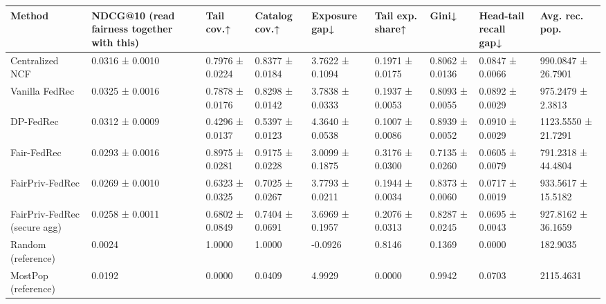 \begin{tabular}{lllllllll}
\toprule
Method & NDCG@10 (read fairness together with this) & Tail cov.↑ & Catalog cov.↑ & Exposure gap↓ & Tail exp. share↑ & Gini↓ & Head-tail recall gap↓ & Avg. rec. pop. \\
\midrule
Centralized NCF & 0.0316 ± 0.0010 & 0.7976 ± 0.0224 & 0.8377 ± 0.0184 & 3.7622 ± 0.1094 & 0.1971 ± 0.0175 & 0.8062 ± 0.0136 & 0.0847 ± 0.0066 & 990.0847 ± 26.7901 \\
Vanilla FedRec & 0.0325 ± 0.0016 & 0.7878 ± 0.0176 & 0.8298 ± 0.0142 & 3.7838 ± 0.0333 & 0.1937 ± 0.0053 & 0.8093 ± 0.0055 & 0.0892 ± 0.0029 & 975.2479 ± 2.3813 \\
DP-FedRec & 0.0312 ± 0.0009 & 0.4296 ± 0.0137 & 0.5397 ± 0.0123 & 4.3640 ± 0.0538 & 0.1007 ± 0.0086 & 0.8939 ± 0.0052 & 0.0910 ± 0.0029 & 1123.5550 ± 21.7291 \\
Fair-FedRec & 0.0293 ± 0.0016 & 0.8975 ± 0.0281 & 0.9175 ± 0.0228 & 3.0099 ± 0.1875 & 0.3176 ± 0.0300 & 0.7135 ± 0.0260 & 0.0605 ± 0.0079 & 791.2318 ± 44.4804 \\
FairPriv-FedRec & 0.0269 ± 0.0010 & 0.6323 ± 0.0325 & 0.7025 ± 0.0267 & 3.7793 ± 0.0211 & 0.1944 ± 0.0034 & 0.8373 ± 0.0060 & 0.0717 ± 0.0019 & 933.5617 ± 15.5182 \\
FairPriv-FedRec (secure agg) & 0.0258 ± 0.0011 & 0.6802 ± 0.0849 & 0.7404 ± 0.0691 & 3.6969 ± 0.1957 & 0.2076 ± 0.0313 & 0.8287 ± 0.0245 & 0.0695 ± 0.0043 & 927.8162 ± 36.1659 \\
Random (reference) & 0.0024 & 1.0000 & 1.0000 & -0.0926 & 0.8146 & 0.1369 & 0.0000 & 182.9035 \\
MostPop (reference) & 0.0192 & 0.0000 & 0.0409 & 4.9929 & 0.0000 & 0.9942 & 0.0703 & 2115.4631 \\
\bottomrule
\end{tabular}
